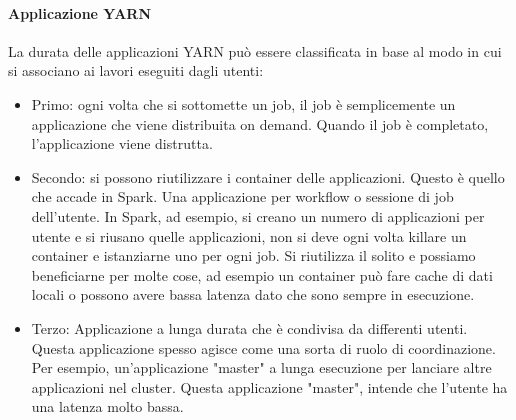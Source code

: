 \documentclass{article}
\begin{document}
\begin{appendices}
\paragraph{Applicazione YARN} 
La durata delle applicazioni YARN può essere classificata in base al modo in cui si associano ai lavori eseguiti dagli utenti:
\begin{itemize}
    \item Primo: ogni volta che si sottomette un job, il job è semplicemente un applicazione che viene distribuita on demand. Quando il job è completato, l'applicazione viene distrutta.
    \item Secondo: si possono riutilizzare i container delle applicazioni. Questo è quello che accade in Spark. Una applicazione per workflow o sessione di job dell'utente. In Spark, ad esempio, si creano un numero di applicazioni per utente e si riusano quelle applicazioni, non si deve ogni volta killare un container e istanziarne uno per ogni job. Si riutilizza il solito e possiamo beneficiarne per molte cose, ad esempio un container può fare cache di dati locali o possono avere bassa latenza dato che sono sempre in esecuzione.
    \item Terzo: Applicazione a lunga durata che è condivisa da differenti utenti. Questa applicazione spesso agisce come una sorta di ruolo di coordinazione. Per esempio, un'applicazione "master" a lunga esecuzione per lanciare altre applicazioni nel cluster. Questa applicazione "master", intende che l'utente ha una latenza molto bassa.
\end{itemize}


\end{appendices}
\end{document}
